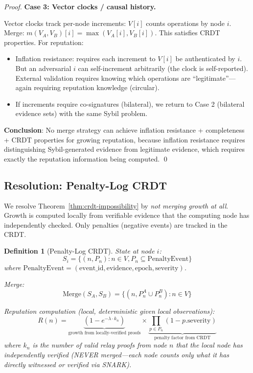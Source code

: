 \documentclass[11pt,a4paper]{article}
\newtheorem{definition}{Definition}
\begin{document}
\begin{proof}
\textbf{Case 3: Vector clocks / causal history.}

Vector clocks track per-node increments: $V[i]$ counts operations by node $i$. Merge: $m(V_A, V_B)[i] = \max(V_A[i], V_B[i])$. This satisfies CRDT properties. For reputation:
\begin{itemize}[nosep]
    \item Inflation resistance: requires each increment to $V[i]$ be authenticated by $i$. But an adversarial $i$ can self-increment arbitrarily (the clock is self-reported). External validation requires knowing which operations are ``legitimate''---again requiring reputation knowledge (circular).
    \item If increments require co-signatures (bilateral), we return to Case 2 (bilateral evidence sets) with the same Sybil problem.
\end{itemize}

\textbf{Conclusion}: No merge strategy can achieve inflation resistance + completeness + CRDT properties for growing reputation, because inflation resistance requires distinguishing Sybil-generated evidence from legitimate evidence, which requires exactly the reputation information being computed. \qed
\end{proof}

\subsection{Resolution: Penalty-Log CRDT}

We resolve Theorem~\ref{thm:crdt-impossibility} by \emph{not merging growth at all}. Growth is computed locally from verifiable evidence that the computing node has independently checked. Only penalties (negative events) are tracked in the CRDT.

\begin{definition}[Penalty-Log CRDT]
\label{def:penalty-crdt}
State at node $i$:
\begin{equation}
    S_i = \{(n, P_n) : n \in V, P_n \subseteq \text{PenaltyEvent}\}
\end{equation}
where $\text{PenaltyEvent} = (\text{event\_id}, \text{evidence}, \text{epoch}, \text{severity})$.

Merge:
\begin{equation}
    \text{Merge}(S_A, S_B) = \{(n, P_n^A \cup P_n^B) : n \in V\}
\end{equation}

Reputation computation (local, deterministic given local observations):
\begin{equation}
    R(n) = \underbrace{\left(1 - e^{-\lambda \cdot k_n}\right)}_{\text{growth from locally-verified proofs}} \times \underbrace{\prod_{p \in P_n} (1 - p.\text{severity})}_{\text{penalty factor from CRDT}}
\end{equation}
where $k_n$ is the number of valid relay proofs from node $n$ that the local node has independently verified (NEVER merged---each node counts only what it has directly witnessed or verified via SNARK).
\end{definition}
\end{document}
